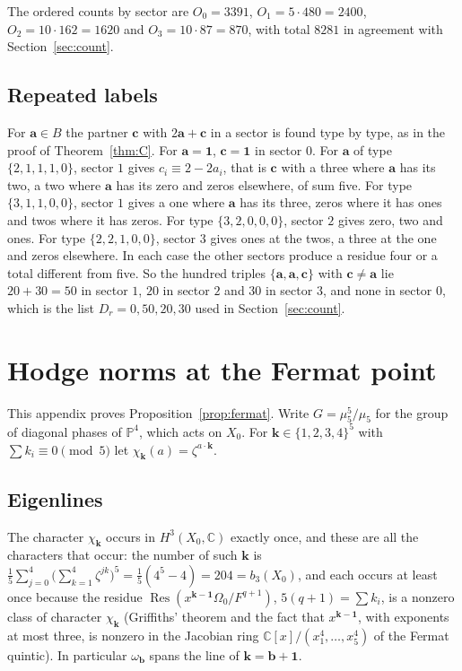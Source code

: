 \documentclass[11pt]{amsart}
\theoremstyle{definition}
\theoremstyle{remark}
\newcommand{\C}{\mathbb{C}}
\newcommand{\PP}{\mathbb{P}}
\newcommand{\Res}{\operatorname{Res}}
\newcommand{\bb}{\mathbf{b}}
\newcommand{\cc}{\mathbf{c}}
\newcommand{\va}{\mathbf{a}}
\newcommand{\one}{\mathbf{1}}
\begin{document}
The ordered counts by sector are $O_0=3391$, $O_1=5\cdot480=2400$,
$O_2=10\cdot162=1620$ and $O_3=10\cdot87=870$, with total $8281$ in
agreement with Section~\ref{sec:count}.

\subsection{Repeated labels}

For $\va\in B$ the partner $\cc$ with $2\va+\cc$ in a sector is found type
by type, as in the proof of Theorem~\ref{thm:C}. For $\va=\one$, $\cc=\one$
in sector $0$. For $\va$ of type $\{2,1,1,1,0\}$, sector $1$ gives
$c_i\equiv2-2a_i$, that is $\cc$ with a three where $\va$ has its two, a two
where $\va$ has its zero and zeros elsewhere, of sum five. For type
$\{3,1,1,0,0\}$, sector $1$ gives a one where $\va$ has its three, zeros
where it has ones and twos where it has zeros. For type $\{3,2,0,0,0\}$,
sector $2$ gives zero, two and ones. For type $\{2,2,1,0,0\}$, sector $3$
gives ones at the twos, a three at the one and zeros elsewhere. In each case
the other sectors produce a residue four or a total different from five.
So the hundred triples $\{\va,\va,\cc\}$ with $\cc\ne\va$ lie $20+30=50$ in
sector $1$, $20$ in sector $2$ and $30$ in sector $3$, and none in sector
$0$, which is the list $D_r=0,50,20,30$ used in Section~\ref{sec:count}.

\section{Hodge norms at the Fermat point}\label{app:fermat}

This appendix proves Proposition~\ref{prop:fermat}. Write
$G=\mu_5^5/\mu_5$ for the group of diagonal phases of $\PP^4$, which acts
on $X_0$. For $\mathbf k\in\{1,2,3,4\}^5$ with $\sum k_i\equiv0\pmod5$ let
$\chi_{\mathbf k}(a)=\zeta^{a\cdot\mathbf k}$.

\subsection{Eigenlines}

The character $\chi_{\mathbf k}$ occurs in $H^3(X_0,\C)$ exactly once, and
these are all the characters that occur: the number of such $\mathbf k$ is
$\frac15\sum_{j=0}^4\big(\sum_{k=1}^4\zeta^{jk}\big)^5=\frac15(4^5-4)=204
=b_3(X_0)$, and each occurs at least once because the residue
$\Res(x^{\mathbf k-\one}\Omega_0/F^{q+1})$, $5(q+1)=\sum k_i$, is a nonzero
class of character $\chi_{\mathbf k}$ (Griffiths' theorem and the fact that
$x^{\mathbf k-\one}$, with exponents at most three, is nonzero in the
Jacobian ring $\C[x]/(x_1^4,\dots,x_5^4)$ of the Fermat quintic). In
particular $\omega_{\bb}$ spans the line of $\mathbf k=\bb+\one$.
\end{document}
